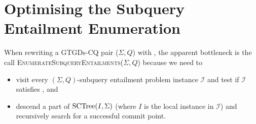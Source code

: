 \documentclass[12pt]{report}
\theoremstyle{plain}
\theoremstyle{definition}
\newcommand{\SCTree}[2]{\ensuremath{\normalfont{\textrm{SCTree}}\!\left( #1, #2 \right)}}
\begin{document}
\section{Optimising the Subquery Entailment Enumeration}
\label{section:secomputation-optimisations}

When rewriting a GTGDs-CQ pair ($\Sigma, Q$) with , the apparent bottleneck is the call \textsc{EnumerateSubqueryEntailments}($\Sigma, Q$) because we need to
\begin{itemize}
  \item visit every $(\Sigma, Q)$-subquery entailment problem instance $\mathcal{I}$ and test if $\mathcal{I}$ satisfies , and
  \item descend a part of $\SCTree{I}{\Sigma}$ (where $I$ is the local instance in $\mathcal{I}$) and recursively search for a successful commit point.
\end{itemize}
\end{document}

